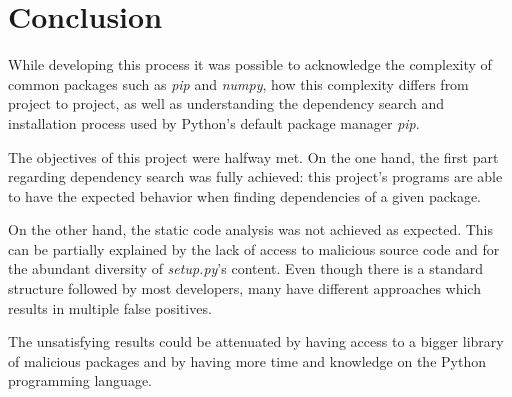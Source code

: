 \chapter{Conclusion}

While developing this process it was possible to acknowledge the complexity of common packages such as \textit{pip} and \textit{numpy}, how this complexity differs from project to project, as well as understanding the dependency search and installation process used by Python's default package manager \textit{pip}.

The objectives of this project were halfway met. On the one hand, the first part regarding dependency search was fully achieved: this project's programs are able to have the expected behavior when finding dependencies of a given package.

On the other hand, the static code analysis was not achieved as expected. This can be partially explained by the lack of access to malicious source code and for the abundant diversity of \textit{setup.py}'s content. Even though there is a standard structure followed by most developers, many have different approaches which results in multiple false positives.

The unsatisfying results could be attenuated by having access to a bigger library of malicious packages and by having more time and knowledge on the Python programming language.